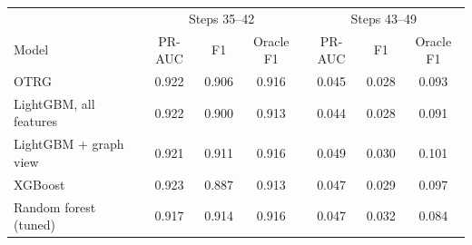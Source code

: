 \begin{tabular}{lcccccc}
\toprule
& \multicolumn{3}{c}{Steps 35--42} & \multicolumn{3}{c}{Steps 43--49} \\
Model & PR-AUC & F1 & Oracle F1 & PR-AUC & F1 & Oracle F1 \\
\midrule
OTRG & 0.922 & 0.906 & 0.916 & 0.045 & 0.028 & 0.093 \\
LightGBM, all features & 0.922 & 0.900 & 0.913 & 0.044 & 0.028 & 0.091 \\
LightGBM + graph view & 0.921 & 0.911 & 0.916 & 0.049 & 0.030 & 0.101 \\
XGBoost & 0.923 & 0.887 & 0.913 & 0.047 & 0.029 & 0.097 \\
Random forest (tuned) & 0.917 & 0.914 & 0.916 & 0.047 & 0.032 & 0.084 \\
\bottomrule
\end{tabular}
